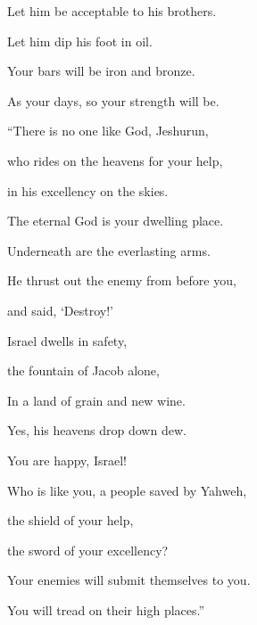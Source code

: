 {\par }{\QB Let him be acceptable to his brothers.
\par }{\QB Let him dip his foot in oil.
\par }{\Q {}Your bars will be iron and bronze.
\par }{\QB As your days, so your strength will be.
\par }{\BB \par }{\Q {}“There is no one like God, Jeshurun,
\par }{\QB who rides on the heavens for your help,
\par }{\QB in his excellency on the skies.
\par }{\Q {}The eternal God is your dwelling place.
\par }{\QB Underneath are the everlasting arms.
\par }{\Q He thrust out the enemy from before you,
\par }{\QB and said, ‘Destroy!’
\par }{\Q {}Israel dwells in safety,
\par }{\QB the fountain of Jacob alone,
\par }{\Q In a land of grain and new wine.
\par }{\QB Yes, his heavens drop down dew.
\par }{\Q {}You are happy, Israel!
\par }{\QB Who is like you, a people saved by Yahweh,
\par }{\QB the shield of your help,
\par }{\QB the sword of your excellency?
\par }{\Q Your enemies will submit themselves to you.
\par }{\QB You will tread on their high places.”

}
